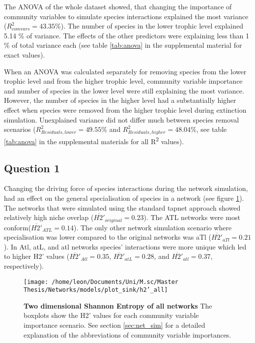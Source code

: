 \documentclass[12pt,a4paper]{article}
\begin{document}
The ANOVA of the whole dataset showed, that changing the importance of community variables to simulate species interactions explained the most variance ($ R^2_{com vars} = 43.35 \% $). The number of species in the lower trophic level explained 5.14 \% of variance. The effects of the other predictors were explaining less than 1 \% of total variance each (see table \ref{tab:anova} in the supplemental material for exact values).

When an ANOVA was calculated separately for removing species from the lower trophic level and from the higher trophic level, community variable importance and number of species in the lower level were still explaining the most variance. However, the number of species in the higher level had a substantially higher effect when species were removed from the higher trophic level during extinction simulation. Unexplained variance did not differ much between species removal scenarios ($ R^2_{Residuals, lower} = 49.55 \% $ and $ R^2_{Residuals, higher} = 48.04 \% $, see table \ref{tab:anova} in the supplemental materials for all R\textsuperscript{2} values). 


%

\subsection{Question 1}

Changing the driving force of species interactions during the network simulation, had an effect on the general specialisation of species in a network (see figure \ref{fig:h2}). The networks that were simulated using the standard tapnet approach showed relatively high niche overlap ($ \overline{H2'}_{original} = 0.23 $). The ATL networks were most conform($ \overline{H2'}_{ATL} = 0.14 $). The only other network simulation scenario where specialisation was lower compared to the original networks was aTl ($ \overline{H2'}_{aTl} = 0.21 $). In Atl, atL, and atl networks species' interactions were more unique which led to higher H2' values ($ \overline{H2'}_{Atl} = 0.35 $, $ \overline{H2'}_{atL} = 0.28 $, and $ \overline{H2'}_{atl} = 0.37 $, respectively).
\begin{figure}[h]
	 \texttt{[image: /home/leon/Documents/Uni/M.sc/Master Thesis/Networks/models/plot\_sink/h2'\_all]}
	 \caption{\textbf{Two dimensional Shannon Entropy of all networks} The boxplots show the H2' values for each community variable importance scenario. See section \ref{sec:net_sim} for a detailed explanation of the abbreviations of community variable importances.}
	 \label{fig:h2}
\end{figure}
\end{document}

